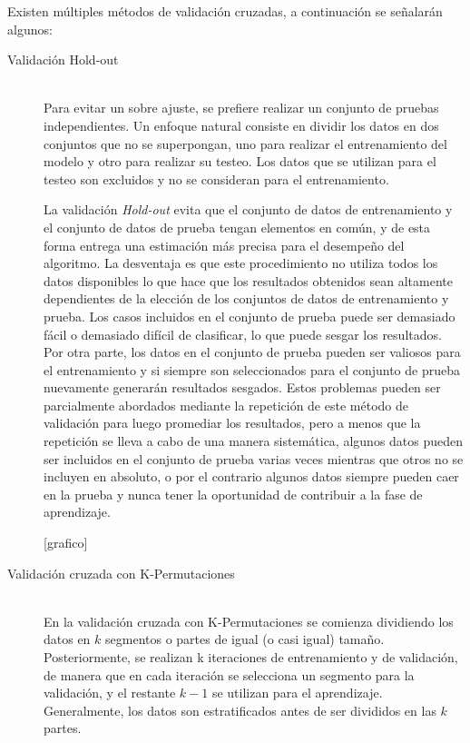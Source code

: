 Existen múltiples métodos de validación cruzadas, a continuación se señalarán algunos:
    \begin{description}
      \item[Validación Hold-out] \hfill \\
      Para evitar un sobre ajuste, se prefiere realizar un conjunto de pruebas independientes. Un enfoque natural consiste en dividir los datos en dos conjuntos que no se superpongan, uno para realizar el entrenamiento del modelo y otro para realizar su testeo. Los datos que se utilizan para el testeo son excluidos y no se consideran para el entrenamiento. 
      
      La validación \textit{Hold-out} evita que el conjunto de datos de entrenamiento y el conjunto de datos de prueba tengan elementos en común, y de esta forma entrega una estimación más precisa para el desempeño del algoritmo. La desventaja es que este procedimiento no utiliza todos los datos disponibles lo que hace que los resultados obtenidos sean altamente dependientes de la elección de los conjuntos de datos de entrenamiento y prueba. Los casos incluidos en el conjunto de prueba puede ser demasiado fácil o demasiado difícil de clasificar, lo que puede sesgar los resultados. Por otra parte, los datos en el conjunto de prueba pueden ser valiosos para el entrenamiento y si siempre son seleccionados para el conjunto de prueba nuevamente generarán resultados sesgados. Estos problemas pueden ser parcialmente abordados mediante la repetición de este método de validación para luego promediar los resultados, pero a menos que la repetición se lleva a cabo de una manera sistemática, algunos datos pueden ser incluidos en el conjunto de prueba varias veces mientras que otros no se incluyen en absoluto, o por el contrario algunos datos siempre pueden caer en la prueba y nunca tener la oportunidad de contribuir a la fase de aprendizaje. 
      
      [grafico]
      
      \item[Validación cruzada con K-Permutaciones] \hfill \\
      En la validación cruzada con K-Permutaciones se comienza dividiendo los datos en $k$ segmentos o partes de igual (o casi igual) tamaño. Posteriormente, se realizan k iteraciones de entrenamiento y de validación, de manera que en cada iteración se selecciona un segmento para la validación, y el restante $k-1$ se utilizan para el aprendizaje. Generalmente, los datos son estratificados antes de ser divididos en las $k$ partes.
      

\end{description}
